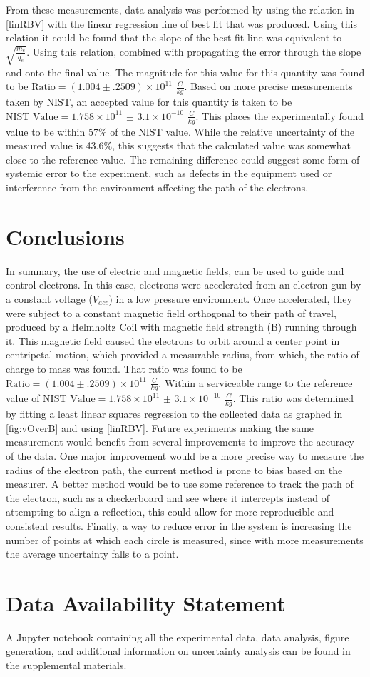 \documentclass[%
 reprint,
 amsmath,amssymb,
 aps,
]{revtex4-2}
\begin{document}
From these measurements, data analysis was performed \cite{supp} by using the relation in \eqref{linRBV} with the linear regression line of best fit that was produced. Using this relation it could be found that the slope of the best fit line was equivalent to $\sqrt{\frac{m_e}{q_e}}$. Using this relation, combined with propagating the error through the slope and onto the final value. The magnitude for this value for this quantity was found to be $\text{Ratio} = ( 1.004 \pm .2509 )\times 10^{11}$ $\frac{C}{kg}$. Based on more precise measurements taken by NIST, an accepted value for this quantity is taken to be $\text{NIST Value} = 1.758 \times 10^{11}$  $\pm$ $3.1 \times 10^{-10}$  $\frac{C}{kg}$. This places the experimentally found value to be within 57$\%$ of the NIST value. While the relative uncertainty of the measured value is 43.6$\%$, this suggests that the calculated value was somewhat close to the reference value. The remaining difference could suggest some form of systemic error to the experiment, such as defects in the equipment used or interference from the environment affecting the path of the electrons.



\section{Conclusions}
In summary, the use of electric and magnetic fields, can be used to guide and control electrons. In this case, electrons were accelerated from an electron gun by a constant voltage ($V_{acc}$) in a low pressure environment. Once accelerated, they were subject to a constant magnetic field orthogonal to their path of travel, produced by a Helmholtz Coil with magnetic field strength (B) running through it. This magnetic field caused the electrons to orbit around a center point in centripetal motion, which provided a measurable radius, from which, the ratio of charge to mass was found. That ratio was found to be $\text{Ratio} = ( 1.004 \pm .2509 )\times 10^{11}$ $\frac{C}{kg}$. Within a serviceable range to the reference value of $\text{NIST Value} = 1.758 \times 10^{11}$  $\pm$ $3.1 \times 10^{-10}$  $\frac{C}{kg}$. This ratio was determined by fitting a least linear squares regression to the collected data as graphed in \ref{fig:vOverB} and using \eqref{linRBV}. Future experiments making the same measurement would benefit from several improvements to improve the accuracy of the data. One major improvement would be a more precise way to measure the radius of the electron path, the current method is prone to bias based on the measurer. A better method would be to use some reference to track the path of the electron, such as a checkerboard and see where it intercepts instead of attempting to align a reflection, this could allow for more reproducible and consistent results. Finally, a way to reduce error in the system is increasing the number of points at which each circle is measured, since with more measurements the average uncertainty falls to a point.


\section*{Data Availability Statement}
A Jupyter notebook containing all the experimental data, data analysis, figure generation, and additional information on uncertainty analysis can be found in the supplemental materials. \cite{supp}

\end{document}
